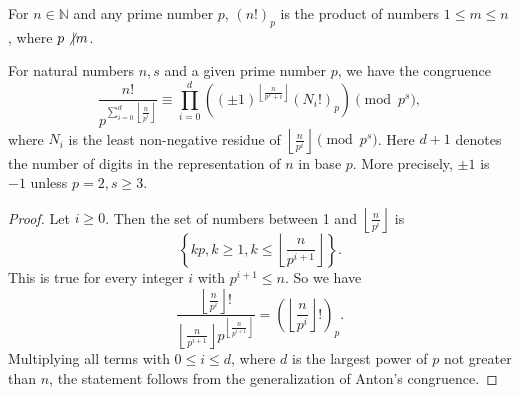 \documentclass[12pt]{article}
\newcommand{\pfac}[1]{\left(#1!\right)_p}
\begin{document}
For $n \in \mathbb{N}$ and any prime number $p$, $\pfac{n}$ is the product of numbers $1 \le m \le n$, where $p \not\vert m$.

For natural numbers $n, s$ and a given prime number $p$, we have the congruence
\begin{displaymath} \frac{n!}{p^{\sum\limits_{i=0}^d \left\lfloor
\frac{n}{p^i}\right\rfloor}} \equiv\prod\limits_{i=0}^d\left((\pm
1)^{\left\lfloor\frac{n}{p^s+i}\right\rfloor} \pfac{N_i}\right) \pmod{p^s},
\end{displaymath}
where $N_i$ is the least non-negative residue of $\left\lfloor \frac{n}{p^i}\right\rfloor
\pmod{p^s}$. Here $d+1$ denotes the number of digits in the representation
of $n$ in base $p$. More precisely, $\pm 1$ is $-1$ unless $p=2, s \ge 3$.

\begin{proof}
Let $i \ge 0$. Then the set of numbers between 1 and
$\left\lfloor \frac{n}{p^i}\right\rfloor$ is
\[\left\{kp, k \ge 1, k \le \left\lfloor\frac{n}{p^{i+1}}\right\rfloor\right\}.\]
This is true for every integer $i$ with $p^{i+1} \le n$. So we have
\begin{equation}
\label{F1}
\frac{\left\lfloor \frac{n}{p^i}\right\rfloor!}{\left\lfloor \frac{n}{p^{i+1}}\right\rfloor
p^{\left\lfloor\frac{n}{p^{i+1}}\right\rfloor}}
=\pfac{\left\lfloor\frac{n}{p^i}\right\rfloor}.
\end{equation}
Multiplying all terms with $0 \le i \le d$, where $d$ is the largest power of
$p$ not greater than $n$, the statement follows from the generalization of
Anton's congruence.
\end{proof}
\end{document}
